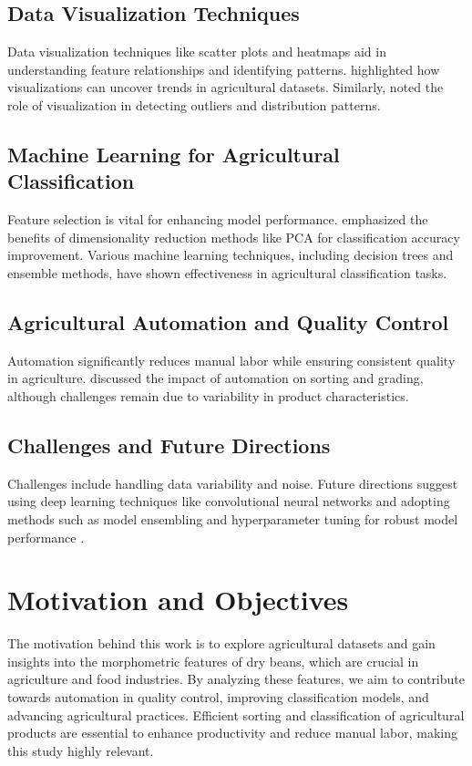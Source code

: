 \documentclass[a4paper,12pt]{article}
\begin{document}
\subsection{Data Visualization Techniques}
Data visualization techniques like scatter plots and heatmaps aid in understanding feature relationships and identifying patterns. \citet{chawathe2021classification} highlighted how visualizations can uncover trends in agricultural datasets. Similarly, \citet{pena2021morphometry} noted the role of visualization in detecting outliers and distribution patterns.

\subsection{Machine Learning for Agricultural Classification}
Feature selection is vital for enhancing model performance. \citet{gautam2022feature} emphasized the benefits of dimensionality reduction methods like PCA for classification accuracy improvement. Various machine learning techniques, including decision trees and ensemble methods, have shown effectiveness in agricultural classification tasks.

\subsection{Agricultural Automation and Quality Control}
Automation significantly reduces manual labor while ensuring consistent quality in agriculture. \citet{sandeep2022modern} discussed the impact of automation on sorting and grading, although challenges remain due to variability in product characteristics.

\subsection{Challenges and Future Directions}
Challenges include handling data variability and noise. Future directions suggest using deep learning techniques like convolutional neural networks and adopting methods such as model ensembling and hyperparameter tuning for robust model performance \cite{khan2023comparison}.



\newpage

\section{Motivation and Objectives}
The motivation behind this work is to explore agricultural datasets and gain insights into the morphometric features of dry beans, which are crucial in agriculture and food industries. By analyzing these features, we aim to contribute towards automation in quality control, improving classification models, and advancing agricultural practices. Efficient sorting and classification of agricultural products are essential to enhance productivity and reduce manual labor, making this study highly relevant.
\end{document}
